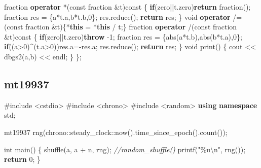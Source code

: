 \documentclass[
]{article}
\newenvironment{Shaded}{}{}
\newcommand{\AttributeTok}[1]{\textcolor[rgb]{0.49,0.56,0.16}{#1}}
\newcommand{\CommentTok}[1]{\textcolor[rgb]{0.38,0.63,0.69}{\textit{#1}}}
\newcommand{\ControlFlowTok}[1]{\textcolor[rgb]{0.00,0.44,0.13}{\textbf{#1}}}
\newcommand{\DataTypeTok}[1]{\textcolor[rgb]{0.56,0.13,0.00}{#1}}
\newcommand{\DecValTok}[1]{\textcolor[rgb]{0.25,0.63,0.44}{#1}}
\newcommand{\ImportTok}[1]{#1}
\newcommand{\KeywordTok}[1]{\textcolor[rgb]{0.00,0.44,0.13}{\textbf{#1}}}
\newcommand{\NormalTok}[1]{#1}
\newcommand{\PreprocessorTok}[1]{\textcolor[rgb]{0.74,0.48,0.00}{#1}}
\newcommand{\SpecialCharTok}[1]{\textcolor[rgb]{0.25,0.44,0.63}{#1}}
\newcommand{\StringTok}[1]{\textcolor[rgb]{0.25,0.44,0.63}{#1}}
\begin{document}
\begin{Shaded}
\begin{Highlighting}[]
\NormalTok{    fraction }\KeywordTok{operator}\NormalTok{ *(}\AttributeTok{const}\NormalTok{ fraction \&t)}\AttributeTok{const}
\NormalTok{    \{}
        \ControlFlowTok{if}\NormalTok{(zero||t.zero)}\ControlFlowTok{return}\NormalTok{ fraction();}
\NormalTok{        fraction res = \{a*t.a,b*t.b,}\DecValTok{0}\NormalTok{\};}
\NormalTok{        res.reduce();}
        \ControlFlowTok{return}\NormalTok{ res;}
\NormalTok{    \}}
    \DataTypeTok{void} \KeywordTok{operator}\NormalTok{ /=(}\AttributeTok{const}\NormalTok{ fraction \&t)\{*}\KeywordTok{this}\NormalTok{ = *}\KeywordTok{this}\NormalTok{ / t;\} }
\NormalTok{    fraction }\KeywordTok{operator}\NormalTok{ /(}\AttributeTok{const}\NormalTok{ fraction \&t)}\AttributeTok{const}
\NormalTok{    \{}
        \ControlFlowTok{if}\NormalTok{(zero||t.zero)}\ControlFlowTok{throw}\NormalTok{ {-}}\DecValTok{1}\NormalTok{;}
\NormalTok{        fraction res = \{abs(a*t.b),abs(b*t.a),}\DecValTok{0}\NormalTok{\};}
        \ControlFlowTok{if}\NormalTok{((a\textgreater{}}\DecValTok{0}\NormalTok{)\^{}(t.a\textgreater{}}\DecValTok{0}\NormalTok{))res.a={-}res.a;}
\NormalTok{        res.reduce();}
        \ControlFlowTok{return}\NormalTok{ res;}
\NormalTok{    \}}
    \DataTypeTok{void}\NormalTok{ print()}
\NormalTok{    \{}
\NormalTok{        cout \textless{}\textless{} dbgs2(a,b) \textless{}\textless{} endl;}
\NormalTok{    \}}
\NormalTok{\};}
\end{Highlighting}
\end{Shaded}

\hypertarget{mt19937}{%
\subsection{mt19937}\label{mt19937}}

\begin{Shaded}
\begin{Highlighting}[]
\PreprocessorTok{\#include }\ImportTok{\textless{}cstdio\textgreater{}}
\PreprocessorTok{\#include }\ImportTok{\textless{}chrono\textgreater{}}
\PreprocessorTok{\#include }\ImportTok{\textless{}random\textgreater{}}
\KeywordTok{using} \KeywordTok{namespace}\NormalTok{ std;}

\NormalTok{mt19937 rng(chrono::steady\_clock::now().time\_since\_epoch().count());}

\DataTypeTok{int}\NormalTok{ main()}
\NormalTok{\{}
\NormalTok{    shuffle(a, a + n, rng); }\CommentTok{//random\_shuffle()}
\NormalTok{    printf(}\StringTok{"}\SpecialCharTok{\%u\textbackslash{}n}\StringTok{"}\NormalTok{, rng());}
    \ControlFlowTok{return} \DecValTok{0}\NormalTok{;}
\NormalTok{\}}
\end{Highlighting}
\end{Shaded}
\end{document}
